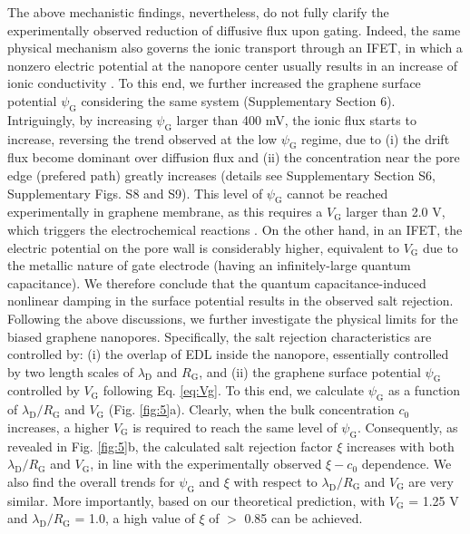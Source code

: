 \documentclass[journal=langd5,email=true, hyperref=true, keywords=false]{achemso}
\newcommand{\Fig}{Fig.}
\begin{document}
The above mechanistic findings, nevertheless, do not fully clarify the
experimentally observed reduction of diffusive flux upon
gating. Indeed, the same physical mechanism also governs the ionic
transport through an IFET, in which a nonzero electric potential at
the nanopore center usually results in an increase of ionic
conductivity \cite{Nam_2009,Lee_2015,Feng_2016}. To this end, we
further increased the graphene surface potential $\psi_{\mathrm{G}}$
considering the same system (Supplementary Section 6). Intriguingly,
by increasing $\psi_{\mathrm{G}}$ larger than 400 mV, the ionic flux
starts to increase, reversing the trend observed at the low
$\psi_{\mathrm{G}}$ regime, due to (i) the drift flux become dominant
over diffusion flux and (ii) the concentration near the pore edge
(prefered path) greatly increases (details see Supplementary Section
S6, Supplementary Figs. S8 and S9). This level of $\psi_{\mathrm{G}}$
cannot be reached experimentally in graphene membrane, as this
requires a $V_{\mathrm{G}}$ larger than 2.0 V, which triggers the
electrochemical reactions \cite{Toh_2011}. On the other hand, in an
IFET, the electric potential on the pore wall is considerably higher,
equivalent to $V_{\mathrm{G}}$ due to the metallic nature of gate
electrode (having an infinitely-large quantum capacitance). We
therefore conclude that the quantum capacitance-induced nonlinear
damping in the surface potential results in the observed salt
rejection.  Following the above discussions, we further investigate
the physical limits for the biased graphene nanopores. Specifically,
the salt rejection characteristics are controlled by: (i) the overlap
of EDL inside the nanopore, essentially controlled by two length
scales of $\lambda_{\mathrm{D}}$ and $R_{\mathrm{G}}$, and (ii) the
graphene surface potential $\psi_{\mathrm{G}}$ controlled by
$V_{\mathrm{G}}$ following Eq. \eqref{eq:Vg}. To this end, we
calculate $\psi_{\mathrm{G}}$ as a function of
$\lambda_{\mathrm{D}} / R_{\mathrm{G}}$ and $V_{\mathrm{G}}$ (\Fig{}
\ref{fig:5}a). Clearly, when the bulk concentration $c_{0}$ increases,
a higher $V_{\mathrm{G}}$ is required to reach the same level of
$\psi_{\mathrm{G}}$. Consequently, as revealed in \Fig{} \ref{fig:5}b,
the calculated salt rejection factor $\xi$ increases with both
$\lambda_{\mathrm{D}} / R_{\mathrm{G}}$ and $V_{\mathrm{G}}$, in line
with the experimentally observed $\xi - c_{0}$ dependence. We also
find the overall trends for $\psi_{\mathrm{G}}$ and $\xi$ with respect
to $\lambda_{\mathrm{D}}/R_{\mathrm{G}}$ and $V_{\mathrm{G}}$ are very
similar. More importantly, based on our theoretical prediction, with
$V_{\mathrm{G}}$ = 1.25 V and $\lambda_{\mathrm{D}} / R_{\mathrm{G}}$
= 1.0, a high value of $\xi$ of $>$ 0.85 can be achieved.
\end{document}
